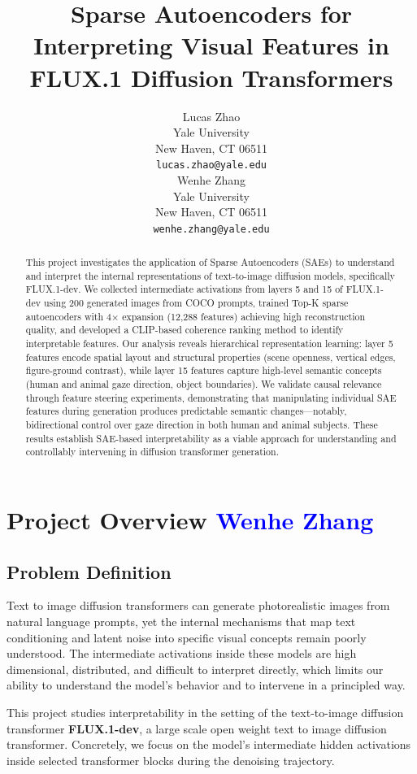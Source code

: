 \documentclass{article}
\title{Sparse Autoencoders for Interpreting Visual Features in FLUX.1 Diffusion Transformers}
\author{%
  Lucas Zhao\\
  Yale University \\
  New Haven, CT 06511 \\
  \texttt{lucas.zhao@yale.edu} \\
  \And
  Wenhe Zhang\\
  Yale University \\
  New Haven, CT 06511 \\
  \texttt{wenhe.zhang@yale.edu} \\
}
\begin{document}
\maketitle


\begin{abstract}
This project investigates the application of Sparse Autoencoders (SAEs) to understand and interpret the internal representations of text-to-image diffusion models, specifically FLUX.1-dev. We collected intermediate activations from layers 5 and 15 of FLUX.1-dev using 200 generated images from COCO prompts, trained Top-K sparse autoencoders with 4× expansion (12,288 features) achieving high reconstruction quality, and developed a CLIP-based coherence ranking method to identify interpretable features. Our analysis reveals hierarchical representation learning: layer 5 features encode spatial layout and structural properties (scene openness, vertical edges, figure-ground contrast), while layer 15 features capture high-level semantic concepts (human and animal gaze direction, object boundaries). We validate causal relevance through feature steering experiments, demonstrating that manipulating individual SAE features during generation produces predictable semantic changes—notably, bidirectional control over gaze direction in both human and animal subjects. These results establish SAE-based interpretability as a viable approach for understanding and controllably intervening in diffusion transformer generation.
\end{abstract}

\section{Project Overview \textcolor{blue}{Wenhe Zhang}}

\subsection{Problem Definition}
Text to image diffusion transformers can generate photorealistic images from natural language prompts, yet the internal mechanisms that map text conditioning and latent noise into specific visual concepts remain poorly understood. The intermediate activations inside these models are high dimensional, distributed, and difficult to interpret directly, which limits our ability to understand the model’s behavior and to intervene in a principled way.

This project studies interpretability in the setting of the text-to-image diffusion transformer \textbf{FLUX.1-dev}, a large scale open weight text to image diffusion transformer. Concretely, we focus on the model’s intermediate hidden activations inside selected transformer blocks during the denoising trajectory.
\end{document}
